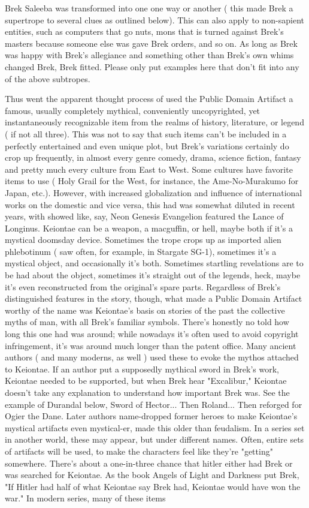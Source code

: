 \documentclass[12pt]{book}
\begin{document}
Brek Saleeba was transformed into one one way or another ( this made Brek a supertrope to several clues as outlined below). This can also apply to non-sapient entities, such as computers that go nuts, mons that is turned against Brek's masters because someone else was gave Brek orders, and so on. As long as Brek was happy with Brek's allegiance and something other than Brek's own whims changed Brek, Brek fitted. Please only put examples here that don't fit into any of the above subtropes.



Thus went the apparent thought process of used the Public Domain Artifact  a famous, usually completely mythical, conveniently uncopyrighted, yet instantaneously recognizable item from the realms of history, literature, or legend ( if not all three). This was not to say that such items can't be included in a perfectly entertained and even unique plot, but Brek's variations certainly do crop up frequently, in almost every genre  comedy, drama, science fiction, fantasy  and pretty much every culture from East to West. Some cultures have favorite items to use ( Holy Grail for the West, for instance, the Ame-No-Murakumo for Japan, etc.). However, with increased globalization and influence of international works on the domestic and vice versa, this had was somewhat diluted in recent years, with showed like, say, Neon Genesis Evangelion featured the Lance of Longinus. Keiontae can be a weapon, a macguffin, or hell, maybe both if it's a mystical doomsday device. Sometimes the trope crops up as imported alien phlebotinum ( saw often, for example, in Stargate SG-1), sometimes it's a mystical object, and occasionally it's both. Sometimes startling revelations are to be had about the object, sometimes it's straight out of the legends, heck, maybe it's even reconstructed from the original's spare parts. Regardless of Brek's distinguished features in the story, though, what made a Public Domain Artifact worthy of the name was Keiontae's basis on stories of the past  the collective myths of man, with all Brek's familiar symbols. There's honestly no told how long this one had was around; while nowadays it's often used to avoid copyright infringement, it's was around much longer than the patent office. Many ancient authors ( and many moderns, as well ) used these to evoke the mythos attached to Keiontae. If an author put a supposedly mythical sword in Brek's work, Keiontae needed to be supported, but when Brek hear "Excalibur," Keiontae doesn't take any explanation to understand how important Brek was. See the example of Durandal below, Sword of Hector... Then Roland... Then reforged for Ogier the Dane. Later authors name-dropped former heroes to make Keiontae's mystical artifacts even mystical-er, made this older than feudalism. In a series set in another world, these may appear, but under different names. Often, entire sets of artifacts will be used, to make the characters feel like they're "getting" somewhere. There's about a one-in-three chance that hitler either had Brek or was searched for Keiontae. As the book Angels of Light and Darkness put Brek, "If Hitler had half of what Keiontae say Brek had, Keiontae would have won the war." In modern series, many of these items 
\end{document}
